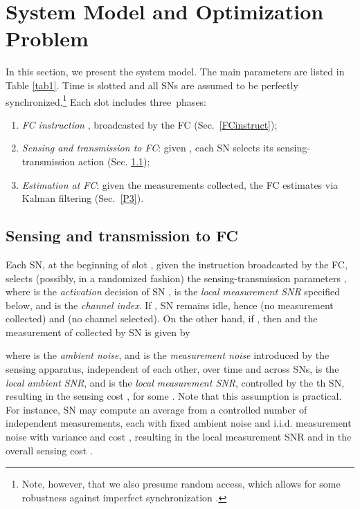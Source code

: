 \documentclass[10pt,twocolumn,twoside]{IEEEtran}
\theoremstyle{plain}
\begin{document}
\section{System Model and Optimization Problem}
\label{sysmo}
 In this section, we present the system model. The main parameters are listed in Table \ref{tab1}.
Time is slotted and all SNs are assumed to be perfectly synchronized.\footnote{Note, however, that 
we also presume random access, which allows for some robustness against imperfect synchronization \cite{Gaudenzi}.}
 Each slot includes three~phases:
 \begin{enumerate}
 \item \emph{FC instruction} , broadcasted by the FC (Sec.~\ref{FCinstruct});
 \item \emph{Sensing and transmission to FC}: given , each SN selects its
 sensing-transmission action (Sec. \ref{ph2});
 \item \emph{Estimation at FC}: given the measurements collected, the FC estimates  via Kalman filtering (Sec.~\ref{P3}).
 \end{enumerate}
 \vspace{-5mm}
\subsection{Sensing and transmission to FC}
 \label{ph2}
\noindent  Each SN, at the beginning of slot , given the instruction  broadcasted by the FC,
  selects (possibly, in a randomized fashion) 
  the sensing-transmission parameters , 
 where  is the \emph{activation} decision of SN ,
  is the \emph{local measurement SNR} specified below, and  is the \emph{channel index}.
 If , SN  remains idle, hence  (no measurement collected) and  (no channel selected).
On the other hand, if , then  and
 the measurement of  collected by SN  is given by

where  is the \emph{ambient noise},
and  is the \emph{measurement noise} introduced by the sensing apparatus,
independent of each other, over time and across SNs,
   is the  \emph{local ambient SNR}, and  is the
   \emph{local measurement SNR}, controlled by the th SN, resulting in the sensing cost , for some .
 Note that this assumption is practical. For instance,
 SN  may compute an average from a controlled number  of independent measurements, each with
fixed ambient noise and i.i.d. measurement noise with  variance 
 and cost ,
 resulting in the local measurement SNR  and in the overall
 sensing cost .
\end{document}
